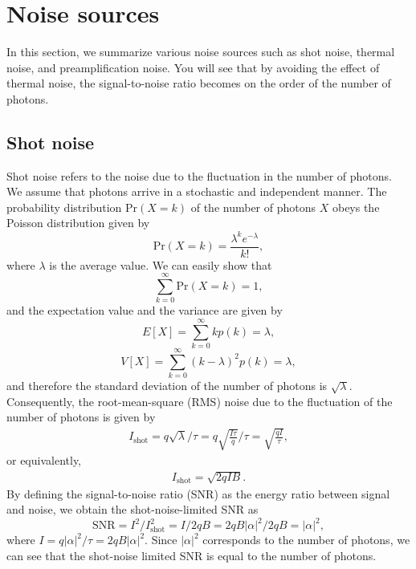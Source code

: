 \documentclass{book}
\begin{document}
\section{Noise sources}
In this section, we summarize various noise sources such as shot noise, thermal noise, and preamplification noise. You will see that by avoiding the effect of thermal noise, the signal-to-noise ratio becomes on the order of the number of photons. 

\subsection{Shot noise}
Shot noise refers to the noise due to the fluctuation in the number of photons. We assume that photons arrive in a stochastic and independent manner. The probability distribution $\mathrm{Pr}(X = k)$ of the number of photons $X$ obeys the Poisson distribution given by
\begin{equation}
	\mathrm{Pr}(X=k) = \frac{\lambda^k e^{-\lambda}}{k!},
\end{equation}
where $\lambda$ is the average value. We can easily show that 
\begin{equation}
	\sum_{k=0}^\infty \mathrm{Pr}(X=k) = 1,
\end{equation}
and the expectation value and the variance are given by
\begin{equation}
	E[X] = \sum_{k=0}^\infty kp(k) = \lambda,
\end{equation}
\begin{equation}
  	V[X] = \sum_{k=0}^\infty (k-\lambda)^2p(k) = \lambda,
\end{equation}
and therefore the standard deviation of the number of photons is $\sqrt \lambda$. Consequently, the root-mean-square (RMS) noise due to the fluctuation of the number of photons is given by
\begin{equation}
	\begin{aligned}
		I_{\mathrm{shot}} = q\sqrt{\lambda}/\tau = q\sqrt{\frac{I\tau}{q}}/\tau = \sqrt{\frac{qI}{\tau}},
	\end{aligned}
\end{equation}
or equivalently,
\begin{equation}
	\begin{aligned}
		I_\mathrm{shot}=\sqrt{2qIB}.
	\end{aligned}
\end{equation}
By defining the signal-to-noise ratio (SNR) as the energy ratio between signal and noise, we obtain the shot-noise-limited SNR as
\begin{equation}
  \mathrm{SNR} = I^2 / I_\mathrm{shot}^2 = I/2qB = 2qB|\alpha |^2/2qB = |\alpha|^2,
\end{equation}
where $I=q|\alpha|^2/\tau = 2qB|\alpha|^2$. Since $|\alpha|^2$ corresponds to the number of photons, we can see that the shot-noise limited SNR is equal to the number of photons.
\end{document}
